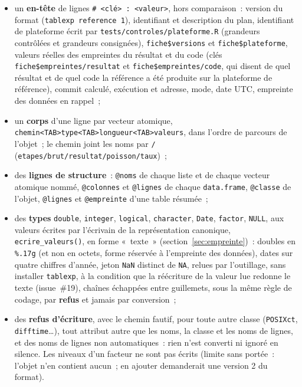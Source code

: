 \documentclass[a4paper,11pt]{article}
\newcommand{\code}[1]{\texttt{\small #1}}
\begin{document}
\begin{itemize}[leftmargin=*, itemsep=2pt]
  \item \sloppy un \textbf{en-tête} de lignes \code{\# <clé> : <valeur>}, hors
    comparaison~: version du format (\code{tablexp reference 1}),
    identifiant et description du plan, identifiant de plateforme écrit par
    \code{tests/controles/}\allowbreak\code{plateforme.R} (grandeurs contrôlées et grandeurs
    consignées), \code{fiche\$versions} et \code{fiche\$plateforme},
    valeurs réelles des empreintes du résultat et du code (clés
    \code{fiche\$empreintes/resultat} et \code{fiche\$empreintes/code}, qui
    disent de quel résultat et de quel code la référence a été produite sur
    la plateforme de référence), commit calculé, exécution et adresse, mode,
    date UTC, empreinte des données en rappel~;
  \item un \textbf{corps} d'une ligne par vecteur atomique,
    \code{chemin<TAB>type<TAB>}\allowbreak\code{longueur<TAB>valeurs}, dans l'ordre de
    parcours de l'objet~; le chemin joint les noms par \code{/}
    (\code{etapes/brut/resultat/poisson/taux})~;
  \item des \textbf{lignes de structure}~: \code{@noms} de chaque liste et
    de chaque vecteur atomique nommé, \code{@colonnes} et \code{@lignes} de
    chaque \code{data.frame}, \code{@classe} de l'objet, \code{@lignes} et
    \code{@empreinte} d'une table résumée~;
  \item des \textbf{types} \code{double}, \code{integer}, \code{logical},
    \code{character}, \code{Date}, \code{factor}, \code{NULL}, aux valeurs
    écrites par l'écrivain de la représentation canonique,
    \code{ecrire\_valeurs()}, en forme «~texte~»
    (section~\ref{sec:empreinte})~: doubles en \code{\%.17g} (et non en
    octets, forme réservée à l'empreinte des données), dates sur quatre
    chiffres d'année, jeton \code{NaN} distinct de \code{NA}, relues par
    l'outillage, sans installer \code{tablexp}, à la condition que la
    réécriture de la valeur lue redonne le texte (issue~\#19), chaînes
    échappées entre guillemets, sous la même règle de codage, par
    \textbf{refus} et jamais par conversion~;
  \item des \textbf{refus d'écriture}, avec le chemin fautif, pour toute
    autre classe (\code{POSIXct}, \code{difftime}\ldots), tout attribut
    autre que les noms, la classe et les noms de lignes, et des noms de
    lignes non automatiques~: rien n'est converti ni ignoré en silence. Les
    niveaux d'un facteur ne sont pas écrits (limite sans portée~: l'objet
    n'en contient aucun~; en ajouter demanderait une version 2 du format).
\end{itemize}
\end{document}
